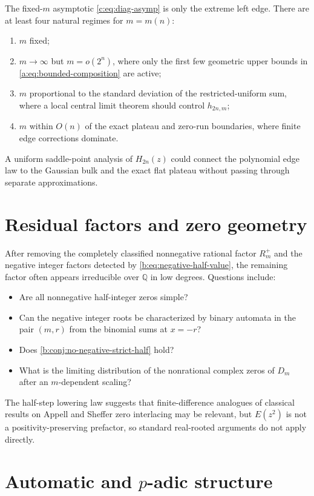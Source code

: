 \documentclass[11pt,a4paper,oneside,openany]{book}
\numberwithin{equation}{chapter}
\theoremstyle{definition}
\theoremstyle{remark}
\newcommand{\Q}{\mathbb Q}
\newcommand{\TM}{E}
\newcommand{\Diag}{D}
\begin{document}
The fixed-$m$ asymptotic \eqref{c:eq:diag-asymp} is only the extreme left edge.
There are at least four natural regimes for $m=m(n)$:
\begin{enumerate}
 \item $m$ fixed;
 \item $m\to\infty$ but $m=o(2^n)$, where only the first few geometric upper
       bounds in \eqref{a:eq:bounded-composition} are active;
 \item $m$ proportional to the standard deviation of the restricted-uniform
       sum, where a local central limit theorem should control $h_{2n,m}$;
 \item $m$ within $O(n)$ of the exact plateau and zero-run boundaries, where
       finite edge corrections dominate.
\end{enumerate}
A uniform saddle-point analysis of
$H_{2n}(z)$ could connect the polynomial edge law to the Gaussian bulk and
the exact flat plateau without passing through separate approximations.

\section{Residual factors and zero geometry}

After removing the completely classified nonnegative rational factor
$R_m^+$ and the negative integer factors detected by
\eqref{b:eq:negative-half-value}, the remaining factor often appears
irreducible over $\Q$ in low degrees.  Questions include:
\begin{itemize}
 \item Are all nonnegative half-integer zeros simple?
 \item Can the negative integer roots be characterized by binary automata in
       the pair $(m,r)$ from the binomial sums at $x=-r$?
 \item Does \cref{b:conj:no-negative-strict-half} hold?
 \item What is the limiting distribution of the nonrational complex zeros of
       $\Diag_m$ after an $m$-dependent scaling?
\end{itemize}
The half-step lowering law suggests that finite-difference analogues of
classical results on Appell and Sheffer zero interlacing may be relevant, but
$\TM(z^2)$ is not a positivity-preserving prefactor, so standard real-rooted
arguments do not apply directly.

\section{Automatic and \texorpdfstring{$p$-adic}{p-adic} structure}
\end{document}
